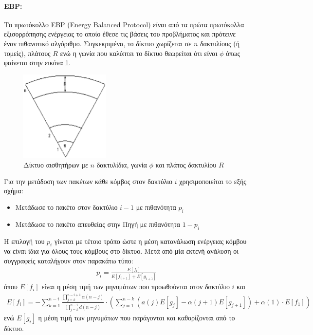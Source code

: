 \paragraph{EBP:} Το πρωτόκολλο EBP (Energy Balanced Protocol) \cite{ebp_protocol} είναι από τα πρώτα πρωτόκολλα εξισορρόπησης ενέργειας το οποίο έθεσε τις βάσεις του
προβλήματος και πρότεινε έναν πιθανοτικό αλγόριθμο. Συγκεκριμένα, το δίκτυο χωρίζεται σε $n$ δακτυλίους (ή τομείς), πλάτους $R$ ενώ η γωνία που καλύπτει το δίκτυο
θεωρείται ότι είναι $\phi$ όπως φαίνεται στην εικόνα \ref{fig:ebp_ring}.

\begin{figure}[h]
	\centering
	\includegraphics[width=0.4\textwidth]{images/ebp_ring.eps}
	\caption{Δίκτυο αισθητήρων με $n$ δακτυλίδια, γωνία $\phi$ και πλάτος δακτυλίου $R$}
	\label{fig:ebp_ring}
\end{figure}

Για την μετάδοση των πακέτων κάθε κόμβος στον δακτύλιο $i$ χρησιμοποιείται το εξής σχήμα:
\begin{itemize}
\item Μετάδωσε το πακέτο στον δακτύλιο $i-1$ με πιθανότητα $p_{i}$
\item Μετάδωσε το πακέτο απευθείας στην Πηγή με πιθανότητα $1-p_{i}$
\end{itemize}

Η επιλογή του $p_{i}$ γίνεται με τέτοιο τρόπο ώστε η μέση κατανάλωση ενέργειας κόμβου να είναι ίδια για όλους τους κόμβους στο δίκτυο.
Μετά από μία εκτενή ανάλυση οι συγγραφείς καταλήγουν στον παρακάτω τύπο:
\begin{align*}
p_{i} = \frac{E[f_{i}]}{E[f_{i+1}] + E[g_{i+1}]}
\end{align*}
όπου $E[f_{i}]$ είναι η μέση τιμή των μηνυμάτων που προωθούνται στον δακτύλιο $i$ και
\begin{align*}
E[f_{i}] = - \sum\limits^{n-i}_{k=1}\frac{\prod_{j=k}^{n-i+1}\alpha(n-j)}{\prod_{j=k}^{n-i}d(n-j)}\cdot
\left(\sum\limits_{j=1}^{n-k}(a(j)E[g_{j}]-\alpha(j+1)E[g_{j+1}])+\alpha(1)\cdot E[f_{1}]\right)
\end{align*}
ενώ $E[g_{i}]$ η μέση τιμή των μηνυμάτων που παράγονται και καθορίζονται από το δίκτυο.

